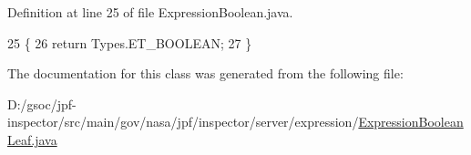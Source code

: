 Definition at line 25 of file Expression\+Boolean.\+java.


\begin{DoxyCode}
25                           \{
26     \textcolor{keywordflow}{return} Types.ET\_BOOLEAN;
27   \}
\end{DoxyCode}


The documentation for this class was generated from the following file\+:\begin{DoxyCompactItemize}
\item 
D\+:/gsoc/jpf-\/inspector/src/main/gov/nasa/jpf/inspector/server/expression/\hyperlink{_expression_boolean_leaf_8java}{Expression\+Boolean\+Leaf.\+java}\end{DoxyCompactItemize}
